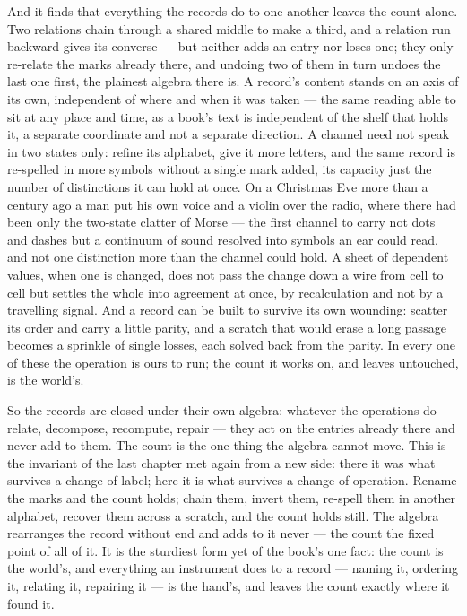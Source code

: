 And it finds that everything the records do to one another leaves the count alone. Two relations chain through a
shared middle to make a third, and a relation run backward gives its converse --- but neither adds an entry nor
loses one; they only re-relate the marks already there, and undoing two of them in turn undoes the last one
first, the plainest algebra there is. A record's content stands on an axis of its own,
independent of where and when it was taken --- the same reading able to sit at any place and time, as a book's
text is independent of the shelf that holds it, a separate coordinate and not a separate direction. A channel
need not speak in two states only: refine its alphabet, give it more letters, and the same record is re-spelled
in more symbols without a single mark added, its capacity just the number of distinctions it can hold at once.
On a Christmas Eve more than a century ago a man put his own voice and a violin over the radio, where there had
been only the two-state clatter of Morse --- the first channel to carry not dots and dashes but a continuum of
sound resolved into symbols an ear could read, and not one distinction more than the channel could hold. A
sheet of dependent values, when one is changed, does not pass the change down a wire from cell to cell but
settles the whole into agreement at once, by recalculation and not by a travelling signal. And a record can be
built to survive its own wounding: scatter its order and carry a little parity, and a scratch that would erase a
long passage becomes a sprinkle of single losses, each solved back from the parity. In every one of these the
operation is ours to run; the count it works on, and leaves untouched, is the world's.

So the records are closed under their own algebra: whatever the operations do --- relate, decompose, recompute,
repair --- they act on the entries already there and never add to them. The count is the one thing the algebra
cannot move. This is the invariant of the last chapter met again from a new side: there it was what survives a
change of label; here it is what survives a change of operation. Rename the marks and the count holds; chain
them, invert them, re-spell them in another alphabet, recover them across a scratch, and the count holds still.
The algebra rearranges the record without end and adds to it never --- the count the fixed point of all of it.
It is the sturdiest form yet of the book's one fact: the count is the world's, and everything an instrument does
to a record --- naming it, ordering it, relating it, repairing it --- is the hand's, and leaves the count
exactly where it found it.

